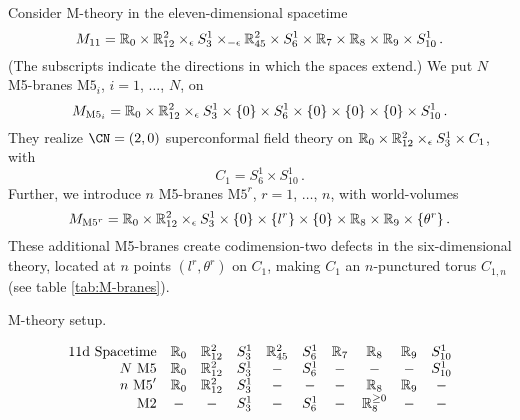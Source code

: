 Consider M-theory in the eleven-dimensional spacetime
\begin{equation}
  M_{11}
  =
  \mathbb{R}_0 \times \mathbb{R}^2_{12} \times_\epsilon S^1_3 \times_{-\epsilon} \mathbb{R}^2_{45}
  \times S^1_6 \times \mathbb{R}_7 \times \mathbb{R}_8 \times \mathbb{R}_9 \times S^1_{10} \,.
\end{equation}
(The subscripts indicate the directions in which the spaces extend.)
We put $N$ M5-branes $\mathrm{M5}_i$, $i = 1$, $\dotsc$, $N$, on
\begin{equation}
  M_{\mathrm{M5}_i} =
  \mathbb{R}_0 \times \mathbb{R}^2_{12} \times_\epsilon S^1_3 \times \{0\}
  \times S^1_6 \times \{0\} \times \{0\} \times \{0\} \times S^1_{10} \,.
\end{equation}
They realize $\CN = (2,0)$ superconformal field theory on
$\mathbb{R}_0 \times \mathbb{R}^2_{12} \times_\epsilon S^1_3 \times C_1$, with
\begin{equation}
  C_1 = S^1_6 \times S^1_{10} \,.
\end{equation}
Further, we introduce $n$ M5-branes $\mathrm{M5}^r$, $r = 1$,
$\dotsc$, $n$, with world-volumes
\begin{equation}
  M_{\mathrm{M5}^r} =
  \mathbb{R}_0 \times \mathbb{R}^2_{12} \times_\epsilon S^1_3 \times \{0\}
  \times \{l^r\} \times \{0\} \times \mathbb{R}_8 \times \mathbb{R}_9 \times \{\theta^r\} \,.
\end{equation}
These additional M5-branes create codimension-two defects in the six-dimensional
theory, located at $n$ points $(l^r,\theta^r)$ on $C_1$, making $C_1$
an $n$-punctured torus $C_{1,n}$ (see table \ref{tab:M-branes}).


\begin{table}
  \caption{M-theory setup.}
  \vspace{-0.5cm}
    \centering
    \begin{equation*}
      \begin{array}{rccccccccc}
        \text{11d Spacetime} & \mathbb{R}_0 & \mathbb{R}_{12}^2 & S_3^1 & \mathbb{R}_{45}^2 & S_6^1 & \mathbb{R}_{7} & \mathbb{R}_{8} & \mathbb{R}_{9} & S_{10}^1 \\
        N \text{ M5}         & \mathbb{R}_0 & \mathbb{R}_{12}^2 & S_3^1 & - & S_6^1 & - & - & - & S_{10}^1 \\
        n \text{ M5}'        & \mathbb{R}_0 & \mathbb{R}_{12}^2 & S_3^1 & - & - & - & \mathbb{R}_8 & \mathbb{R}_9 & - \\
        \text{M2}            & - & - & S_3^1 & - & S_6^1 & - & \mathbb{R}_8^{\geq 0} & - & -
      \end{array}
    \end{equation*}
\label{tab:M-branes}
\end{table}


